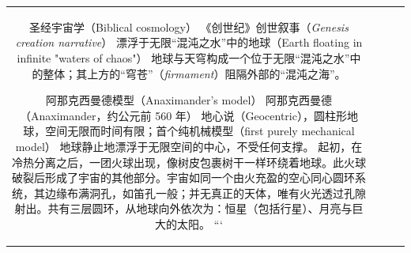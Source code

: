 \begin{table}[ht]
\begin{tabular}{|c|c|c|c|}
圣经宇宙学（Biblical cosmology） \quad 《创世纪》创世叙事（\emph{Genesis creation narrative}） \quad 漂浮于无限“混沌之水”中的地球（Earth floating in infinite "waters of chaos"） \quad 地球与天穹构成一个位于无限“混沌之水”中的整体；其上方的“穹苍”（\emph{firmament}）阻隔外部的“混沌之海”。

阿那克西曼德模型（Anaximander's model） \quad 阿那克西曼德（Anaximander，约公元前 560 年） \quad 地心说（Geocentric），圆柱形地球，空间无限而时间有限；首个纯机械模型（first purely mechanical model） \quad 地球静止地漂浮于无限空间的中心，不受任何支撑。\cite{ref32} 起初，在冷热分离之后，一团火球出现，像树皮包裹树干一样环绕着地球。此火球破裂后形成了宇宙的其他部分。宇宙如同一个由火充盈的空心同心圆环系统，其边缘布满洞孔，如笛孔一般；并无真正的天体，唯有火光透过孔隙射出。共有三层圆环，从地球向外依次为：恒星（包括行星）、月亮与巨大的太阳。\cite{ref33}
```


\end{tabular}
\end{table}
